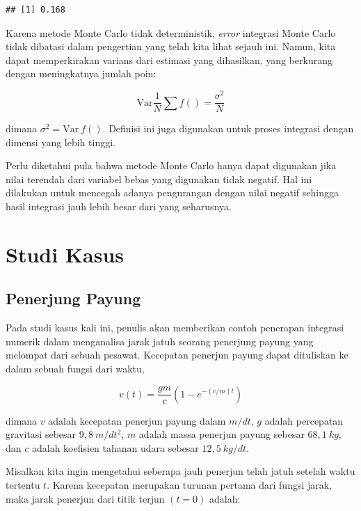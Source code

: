 \documentclass[]{book}
\theoremstyle{definition}
\theoremstyle{definition}
\theoremstyle{definition}
\theoremstyle{remark}
\begin{document}
\begin{verbatim}
## [1] 0.168
\end{verbatim}

Karena metode Monte Carlo tidak deterministik, \emph{error} integrasi Monte Carlo tidak dibatasi dalam pengertian yang telah kita lihat sejauh ini. Namun, kita dapat memperkirakan varians dari estimasi yang dihasilkan, yang berkurang dengan meningkatnya jumlah poin:

\begin{equation}
\text{Var}\frac{1}{N}\sum f\left(\right)=\frac{\sigma^2}{N}
  \label{eq:monte3}
\end{equation}

dimana \(\sigma^2=\text{Var}\ f\left(\right)\). Definisi ini juga digunakan untuk proses integrasi dengan dimensi yang lebih tinggi.

Perlu diketahui pula bahwa metode Monte Carlo hanya dapat digunakan jika nilai terendah dari variabel bebas yang digunakan tidak negatif. Hal ini dilakukan untuk mencegah adanya pengurangan dengan nilai negatif sehingga hasil integrasi jauh lebih besar dari yang seharusnya.

\hypertarget{studi-kasus-2}{%
\section{Studi Kasus}\label{studi-kasus-2}}

\hypertarget{penerjung-payung}{%
\subsection{Penerjung Payung}\label{penerjung-payung}}

Pada studi kasus kali ini, penulis akan memberikan contoh penerapan integrasi numerik dalam menganalisa jarak jatuh seorang penerjung payung yang melompat dari sebuah pesawat. Kecepatan penerjun payung dapat dituliskan ke dalam sebuah fungsi dari waktu,

\begin{equation}
v\left(t\right)=\frac{gm}{c}\left(1-e^{-\left(c/m\right)t}\right)
  \label{eq:terjun}
\end{equation}

dimana \(v\) adalah kecepatan penerjun payung dalam \(m/dt\), \(g\) adalah percepatan gravitasi sebesar \(9,8 \ m/dt^2\), \(m\) adalah massa penerjun payung sebesar \(68,1 \ kg\), dan \(c\) adalah koefisien tahanan udara sebesar \(12,5\ kg/dt\).

Misalkan kita ingin mengetahui seberapa jauh penerjun telah jatuh setelah waktu tertentu \(t\). Karena kecepatan merupakan turunan pertama dari fungsi jarak, maka jarak penerjun dari titik terjun \(\left(t=0\right)\) adalah:
\end{document}
